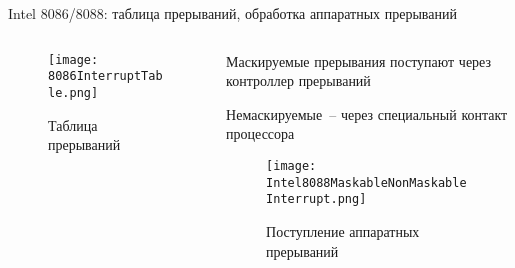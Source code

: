 \documentclass[aspectratio=169,14pt]{beamer}
\begin{document}
\begin{frame}{Intel 8086/8088: таблица прерываний, обработка аппаратных прерываний}
    \begin{columns}[t,onlytextwidth]
        \begin{column}{0.5\textwidth}
            \begin{figure}[t]
                \centering
                \texttt{[image: 8086InterruptTable.png]}
                \captionsetup{skip=-5pt}
                \caption{\tiny{Таблица прерываний}}
            \end{figure}
        \end{column}
        \begin{column}{0.5\textwidth}
            \begin{itemize}
                \begin{spacing}{0.8}
                \begin{footnotesize}
                    \item Маскируемые прерывания поступают через контроллер прерываний
                    \item Немаскируемые~-- через специальный контакт процессора
                \end{footnotesize}
                \end{spacing}
                \begin{figure}[t]
                    \centering
                    \texttt{[image: Intel8088MaskableNonMaskableInterrupt.png]}
                    \captionsetup{skip=-5pt}
                    \caption{\tiny{Поступление аппаратных прерываний}}
                \end{figure}
            \end{itemize}
        \end{column}
    \end{columns}
\end{frame}
\end{document}
